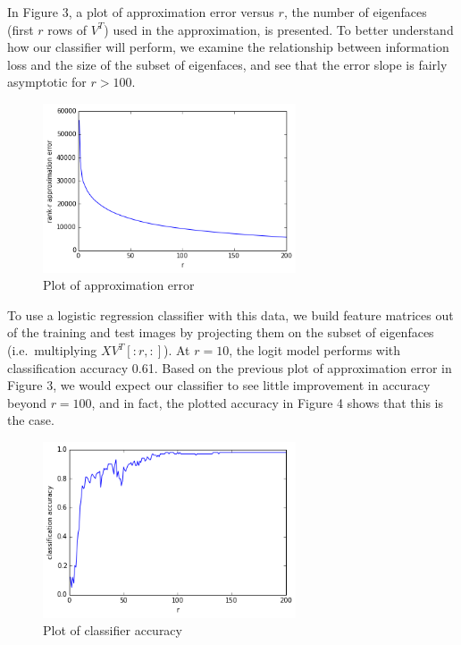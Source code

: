 \documentclass[12pt]{report}
\begin{document}
In Figure 3, a plot of approximation error versus $r$, the number of eigenfaces (first $r$
rows of $V^T$) used in the approximation, is presented. To better understand how our classifier
will perform, we examine the relationship between information loss and the size of the subset of
eigenfaces, and see that the error slope is fairly asymptotic for $r > 100$.

\begin{figure}
\centering
  \includegraphics[width=75mm]{figures/error.png}
\caption{Plot of approximation error}
\end{figure}

To use a logistic regression classifier with this data, we build feature matrices out of the
training and test images by projecting them on the subset of eigenfaces (i.e.\ multiplying
$XV^T[:r,:]$). At $r = 10$, the logit model performs with classification accuracy 0.61. Based
on the previous plot of approximation error in Figure 3, we would expect our classifier
to see little improvement in accuracy beyond $r = 100$, and in fact, the plotted accuracy
in Figure 4 shows that this is the case.

\begin{figure}
\centering
  \includegraphics[width=75mm]{figures/accuracy.png}
\caption{Plot of classifier accuracy}
\end{figure}

\hspace{3mm}

\end{document}
